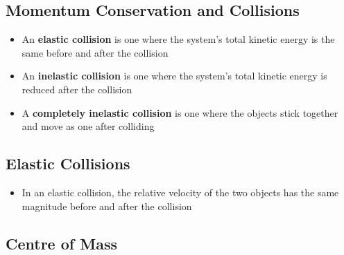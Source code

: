\documentclass{article}
\begin{document}
\subsection{Momentum Conservation and Collisions}

\begin{itemize}
    \item An \textbf{elastic collision} is one where the system's total kinetic energy is the same before and after the collision

    \item An \textbf{inelastic collision} is one where the system's total kinetic energy is reduced after the collision

    \item A \textbf{completely inelastic collision} is one where the objects stick together and move as one after colliding
\end{itemize}

\subsection{Elastic Collisions}

\begin{itemize}
    \item In an elastic collision, the relative velocity of the two objects has the same magnitude before and after the collision
\end{itemize}

\subsection{Centre of Mass}
\end{document}
